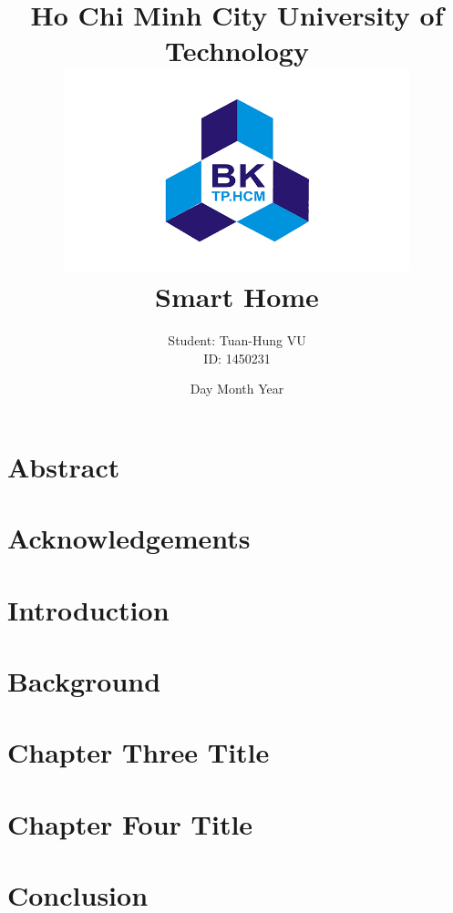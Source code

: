 \documentclass[12pt]{report}
\title{
    {\large Ho Chi Minh City University of Technology}\\
    {\includegraphics[width=100mm, scale=0.7]{BK_logo.png}}\\
    {\Huge Smart Home}\\
}
\author{Student: Tuan-Hung VU\\ID: 1450231}
\date{Day Month Year}
\begin{document}
\maketitle
\chapter*{Abstract}


\chapter*{Acknowledgements}


\tableofcontents
{%
\let\oldnumberline\numberline%
\renewcommand{\numberline}{\figurename~\oldnumberline}%
\listoffigures%
}
\listoftables
\printglossary[title={Acronym and Abbreviation}]
\newpage
\setcounter{page}{1}
\chapter{Introduction}

 
\chapter{Background}

% 
 
\chapter{Chapter Three Title}

 
\chapter{Chapter Four Title}

 
\chapter{Conclusion}

\end{document}
